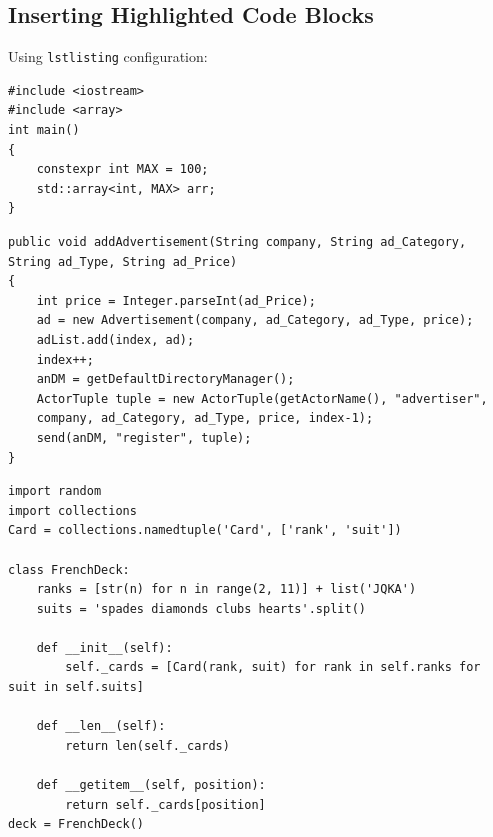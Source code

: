 \documentclass[12pt,a4paper]{article}
\begin{document}
%
%
%
%
%
%

\subsection{Inserting Highlighted Code Blocks}
Using \verb|lstlisting| configuration:
\begin{lstlisting}[style=CPP, title="C++ Code"]
#include <iostream>
#include <array>
int main()
{
    constexpr int MAX = 100;
    std::array<int, MAX> arr;
}  
\end{lstlisting}

\begin{lstlisting}[style=Java, title="Java Code"]
public void addAdvertisement(String company, String ad_Category, String ad_Type, String ad_Price)
{
    int price = Integer.parseInt(ad_Price);
    ad = new Advertisement(company, ad_Category, ad_Type, price);
    adList.add(index, ad);
    index++;
    anDM = getDefaultDirectoryManager();
    ActorTuple tuple = new ActorTuple(getActorName(), "advertiser",
    company, ad_Category, ad_Type, price, index-1);
    send(anDM, "register", tuple);
}
\end{lstlisting}

\begin{lstlisting}[style=Python, title="Python Code"]                
import random
import collections
Card = collections.namedtuple('Card', ['rank', 'suit'])

class FrenchDeck:
    ranks = [str(n) for n in range(2, 11)] + list('JQKA')
    suits = 'spades diamonds clubs hearts'.split()
    
    def __init__(self):
        self._cards = [Card(rank, suit) for rank in self.ranks for suit in self.suits]
        
    def __len__(self):
        return len(self._cards)
        
    def __getitem__(self, position):
        return self._cards[position]
deck = FrenchDeck()
\end{lstlisting}
\end{document}
